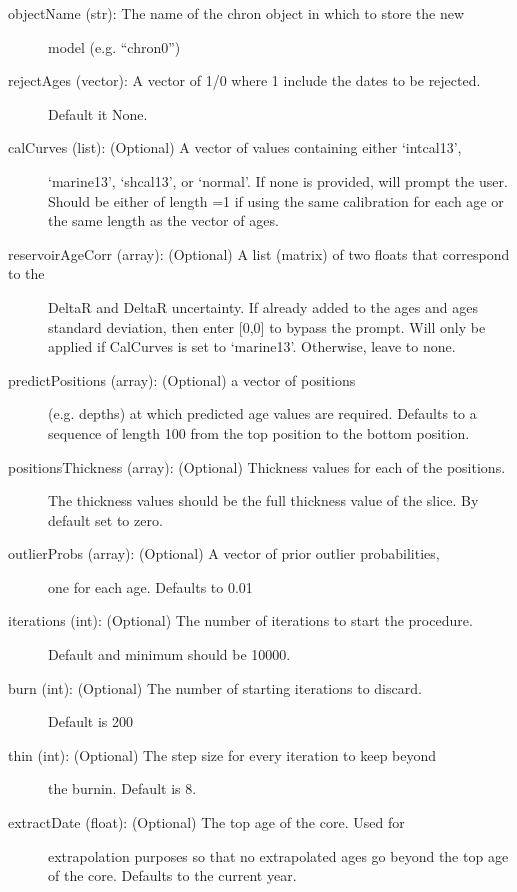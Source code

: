 \documentclass[letterpaper,10pt,english]{sphinxmanual}
\begin{document}
\begin{fulllineitems}
\begin{description}
\begin{description}
\item[{objectName (str): The name of the chron object in which to store the new}] \leavevmode
model (e.g. “chron0”)

\item[{rejectAges (vector): A vector of 1/0 where 1 include the dates to be rejected. }] \leavevmode
Default it None.

\item[{calCurves (list): (Optional) A vector of values containing either ‘intcal13’,}] \leavevmode
‘marine13’, ‘shcal13’, or ‘normal’. If none is provided, will
prompt the user. Should be either of length =1 if using the same
calibration for each age or the same length as the vector of ages.

\item[{reservoirAgeCorr (array): (Optional) A list (matrix) of two floats that correspond to the}] \leavevmode
DeltaR and DeltaR uncertainty. If already added to the ages and
ages standard deviation, then enter {[}0,0{]} to bypass the prompt.
Will only be applied if CalCurves is set to ‘marine13’. Otherwise,
leave to none.

\item[{predictPositions (array): (Optional) a vector of positions }] \leavevmode
(e.g. depths) at which predicted age values are required. 
Defaults to a sequence of length 100 from the top position to the
bottom position.

\item[{positionsThickness (array): (Optional) Thickness values for each of the positions.}] \leavevmode
The thickness values should be the full thickness value of the
slice. By default set to zero.

\item[{outlierProbs (array): (Optional) A vector of prior outlier probabilities,}] \leavevmode
one for each age. Defaults to 0.01

\item[{iterations (int): (Optional) The number of iterations to start the procedure. }] \leavevmode
Default and minimum should be 10000.

\item[{burn (int): (Optional) The number of starting iterations to discard.}] \leavevmode
Default is 200

\item[{thin (int): (Optional) The step size for every iteration to keep beyond}] \leavevmode
the burnin. Default is 8.

\item[{extractDate (float): (Optional) The top age of the core. Used for}] \leavevmode
extrapolation purposes so that no extrapolated ages go beyond the
top age of the core. Defaults to the current year.


\end{description}
\end{description}
\end{fulllineitems}
\end{document}
